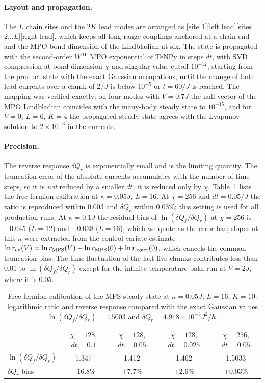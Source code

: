 \documentclass[aps,prl,superscriptaddress,nofootinbib,onecolumn,notitlepage,11pt]{revtex4-2}
\newcommand{\dQ}{\delta Q}
\begin{document}
\paragraph{Layout and propagation.}
The $L$ chain sites and the $2K$ lead modes are arranged as [site 1][left lead][sites $2\dots L$][right lead], which keeps all long-range couplings anchored at a chain end and the MPO bond dimension of the Lindbladian at six. The state is propagated with the second-order $W^{\rm II}$ MPO exponential of TeNPy in steps $dt$, with SVD compression at bond dimension $\chi$ and singular-value cutoff $10^{-12}$, starting from the product state with the exact Gaussian occupations, until the change of both lead currents over a chunk of $2/J$ is below $10^{-5}$ or $t=60/J$ is reached. The mapping was verified exactly: on four modes with $V=0.7J$ the null vector of the MPO Lindbladian coincides with the many-body steady state to $10^{-15}$, and for $V=0$, $L=6$, $K=4$ the propagated steady state agrees with the Lyapunov solution to $2\times10^{-3}$ in the currents.

\paragraph{Precision.}
The reverse response $\dQ_r$ is exponentially small and is the limiting quantity. The truncation error of the absolute currents accumulates with the number of time steps, so it is \emph{not} reduced by a smaller $dt$; it is reduced only by $\chi$. Table~\ref{tab:chi} lists the free-fermion calibration at $\kappa=0.05J$, $L=16$. At $\chi=256$ and $dt=0.05/J$ the ratio is reproduced within $0.003$ and $\dQ_r$ within $0.03\%$; this setting is used for all production runs. At $\kappa=0.1J$ the residual bias of $\ln(\dQ_f/\dQ_r)$ at $\chi=256$ is $+0.045$ ($L=12$) and $-0.038$ ($L=16$), which we quote as the error bar; slopes at this $\kappa$ were extracted from the control-variate estimate $\ln r_{\rm cv}(V)=\ln r_{\rm MPS}(V)-\ln r_{\rm MPS}(0)+\ln r_{\rm exact}(0)$, which cancels the common truncation bias. The time-fluctuation of the last five chunks contributes less than $0.01$ to $\ln(\dQ_f/\dQ_r)$ except for the infinite-temperature-bath run at $V=2J$, where it is $0.05$.

\begin{table}[h]
\caption{Free-fermion calibration of the MPS steady state at $\kappa=0.05J$, $L=16$, $K=10$: logarithmic ratio and reverse response compared with the exact Gaussian values $\ln(\dQ_f/\dQ_r)=1.5003$ and $\dQ_r=4.918\times10^{-3}J^2/\hbar$.}
\label{tab:chi}
\begin{ruledtabular}
\begin{tabular}{lcccc}
 & $\chi=128$, $dt=0.1$ & $\chi=128$, $dt=0.05$ & $\chi=128$, $dt=0.025$ & $\chi=256$, $dt=0.05$ \\
\colrule
$\ln(\dQ_f/\dQ_r)$ & 1.347 & 1.412 & 1.462 & 1.5033 \\
$\dQ_r$ bias & $+16.8\%$ & $+7.7\%$ & $+2.6\%$ & $+0.03\%$ \\
\end{tabular}
\end{ruledtabular}
\end{table}
\end{document}

